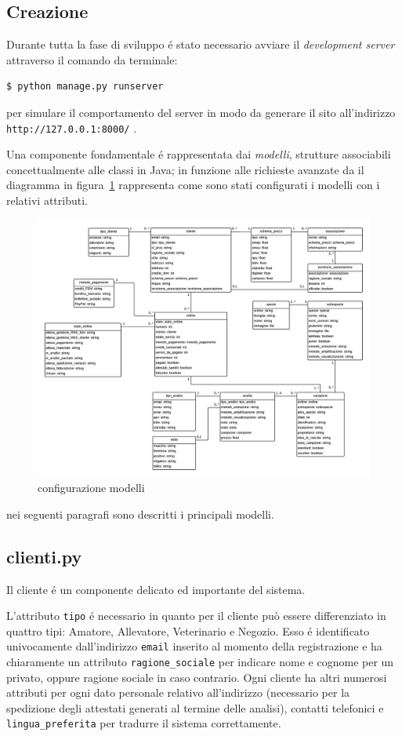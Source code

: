 \subsection{Creazione}
\label{subs:crea}
Durante tutta la fase di sviluppo é stato necessario avviare il \emph{development server} attraverso il comando da terminale:
\begin{verbatim}
$ python manage.py runserver
\end{verbatim}
per simulare il comportamento del server in modo da generare il sito all'indirizzo \texttt{http://127.0.0.1:8000/} .

Una componente fondamentale é rappresentata dai \emph{modelli}, strutture associabili concettualmente alle classi in Java; in funzione alle richieste avanzate da {\fem} il diagramma in figura~\ref{fig:modelli} rappresenta come sono stati configurati i modelli con i relativi attributi.

\begin{figure}
 \includegraphics[width=1\textwidth]{images/modelli.jpg} 
 \caption{configurazione modelli}
 \label{fig:modelli}
\end{figure}

nei seguenti paragrafi sono descritti i principali modelli.

\subsection*{clienti.py}
\label{subs:clienti}
Il cliente é un componente delicato ed importante del sistema. 

L'attributo \texttt{tipo} é necessario in quanto per {\fem} il cliente può essere differenziato in quattro tipi: Amatore, Allevatore, Veterinario e Negozio. Esso é identificato univocamente dall'indirizzo \texttt{email} inserito al momento della registrazione e ha chiaramente un attributo \texttt{ragione\_sociale} per indicare nome e cognome per un privato, oppure ragione sociale in caso contrario. Ogni cliente ha altri numerosi attributi per ogni dato personale relativo all'indirizzo (necessario per la spedizione degli attestati generati al termine delle analisi), contatti telefonici e \texttt{lingua\_preferita} per tradurre il sistema correttamente.

